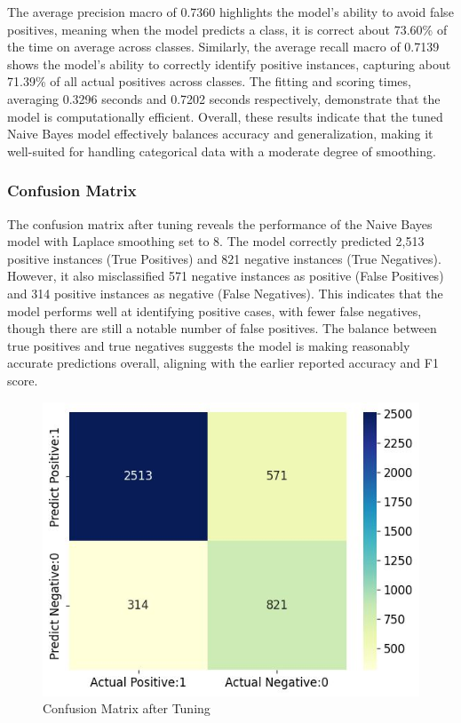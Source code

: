 The average precision macro of 0.7360 highlights the model's ability to avoid false positives, meaning when the model predicts a class, it is correct about 73.60\% of the time on average across classes. Similarly, the average recall macro of 0.7139 shows the model’s ability to correctly identify positive instances, capturing about 71.39\% of all actual positives across classes. The fitting and scoring times, averaging 0.3296 seconds and 0.7202 seconds respectively, demonstrate that the model is computationally efficient. Overall, these results indicate that the tuned Naive Bayes model effectively balances accuracy and generalization, making it well-suited for handling categorical data with a moderate degree of smoothing. 

\subsubsection{Confusion Matrix}
The confusion matrix after tuning reveals the performance of the Naive Bayes model with Laplace smoothing set to 8. The model correctly predicted 2,513 positive instances (True Positives) and 821 negative instances (True Negatives). However, it also misclassified 571 negative instances as positive (False Positives) and 314 positive instances as negative (False Negatives). This indicates that the model performs well at identifying positive cases, with fewer false negatives, though there are still a notable number of false positives. The balance between true positives and true negatives suggests the model is making reasonably accurate predictions overall, aligning with the earlier reported accuracy and F1 score.

\begin{figure}[hbt!]
    \centering
    \includegraphics[width=1\linewidth]{Images/6.7b.jpg}
    \caption{Confusion Matrix after Tuning}
    \label{fig:enter-label}
\end{figure}

